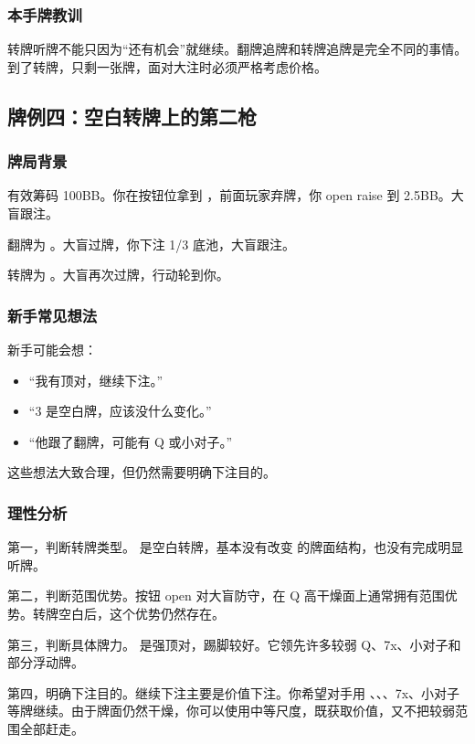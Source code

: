 \subsubsection*{本手牌教训}

转牌听牌不能只因为“还有机会”就继续。翻牌追牌和转牌追牌是完全不同的事情。到了转牌，只剩一张牌，面对大注时必须严格考虑价格。

\subsection{牌例四：空白转牌上的第二枪}

\subsubsection*{牌局背景}

有效筹码 100BB。你在按钮位拿到 ，前面玩家弃牌，你 open raise 到 2.5BB。大盲跟注。

翻牌为 。大盲过牌，你下注 1/3 底池，大盲跟注。

转牌为 。大盲再次过牌，行动轮到你。

\subsubsection*{新手常见想法}

新手可能会想：

\begin{itemize}
\item “我有顶对，继续下注。”
\item “3 是空白牌，应该没什么变化。”
\item “他跟了翻牌，可能有 Q 或小对子。”
\end{itemize}

这些想法大致合理，但仍然需要明确下注目的。

\subsubsection*{理性分析}

第一，判断转牌类型。 是空白转牌，基本没有改变  的牌面结构，也没有完成明显听牌。

第二，判断范围优势。按钮 open 对大盲防守，在 Q 高干燥面上通常拥有范围优势。转牌空白后，这个优势仍然存在。

第三，判断具体牌力。 是强顶对，踢脚较好。它领先许多较弱 Q、7x、小对子和部分浮动牌。

第四，明确下注目的。继续下注主要是价值下注。你希望对手用 、、、7x、小对子等牌继续。由于牌面仍然干燥，你可以使用中等尺度，既获取价值，又不把较弱范围全部赶走。


